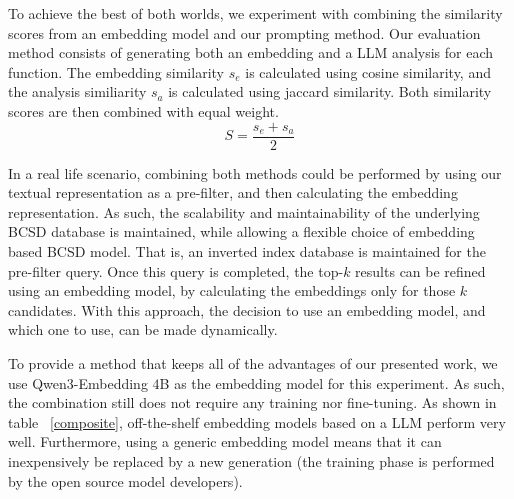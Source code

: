 To achieve the best of both worlds, we experiment with combining the similarity scores from an embedding model and our prompting method.
Our evaluation method consists of generating both an embedding and a LLM analysis for each function. The embedding similarity \(s_e\) is calculated
using cosine similarity, and the analysis similiarity \(s_a\) is calculated using jaccard similarity. Both similarity scores are then combined
with equal weight.
\[
    S = \frac{s_e + s_a}{2}
\]

In a real life scenario, combining both methods could be performed by using our textual representation as a pre-filter, and then calculating
the embedding representation. As such, the scalability and maintainability of the underlying BCSD database is maintained, while allowing a flexible
choice of embedding based BCSD model. That is, an inverted index database is maintained for the pre-filter query. Once this query is completed, the
top-\(k\) results can be refined using an embedding model, by calculating the embeddings only for those \(k\) candidates. With this approach,
the decision to use an embedding model, and which one to use, can be made dynamically.

To provide a method that keeps all of the advantages of our presented work, we use Qwen3-Embedding \(4\)B as the embedding model for this experiment.
As such, the combination still does not require any training nor fine-tuning. As shown in table ~\ref{composite}, off-the-shelf embedding models
based on a LLM perform very well. Furthermore, using a generic embedding model means that it can inexpensively be replaced by a new generation
(the training phase is performed by the open source model developers).

